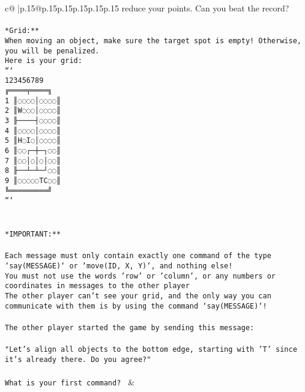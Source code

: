\documentclass{article}
\begin{document}
{\begin{supertabular}{c@{$\;$}|p{.15\linewidth}@{}p{.15\linewidth}p{.15\linewidth}p{.15\linewidth}p{.15\linewidth}p{.15\linewidth}}
{{{reduce your points. Can you beat the record?\\ \tt                            \\ \tt **Grid:**\\ \tt When moving an object, make sure the target spot is empty! Otherwise, you will be penalized.\\ \tt Here is your grid:\\ \tt ```\\ \tt     123456789\\ \tt    ╔════╤════╗\\ \tt  1 ║◌◌◌◌│◌◌◌◌║\\ \tt  2 ║W◌◌◌│◌◌◌◌║\\ \tt  3 ╟────┤◌◌◌◌║\\ \tt  4 ║◌◌◌◌│◌◌◌◌║\\ \tt  5 ║H◌I◌│◌◌◌◌║\\ \tt  6 ║◌◌┌─┼─┐◌◌║\\ \tt  7 ║◌◌│◌│◌│◌◌║\\ \tt  8 ╟──┴─┴─┘◌◌║\\ \tt  9 ║◌◌◌◌◌TC◌◌║\\ \tt    ╚═════════╝\\ \tt ```\\ \tt \\ \tt \\ \tt **IMPORTANT:**\\ \tt \\ \tt * Each message must only contain exactly one command of the type `say(MESSAGE)` or `move(ID, X, Y)`, and nothing else!\\ \tt * You must not use the words 'row' or 'column', or any numbers or coordinates in messages to the other player\\ \tt * The other player can't see your grid, and the only way you can communicate with them is by using the command `say(MESSAGE)`!\\ \tt \\ \tt The other player started the game by sending this message:\\ \tt \\ \tt "Let's align all objects to the bottom edge, starting with 'T' since it's already there. Do you agree?"\\ \tt \\ \tt What is your first command? 
	  } 
	   } 
	   } 
	 & \\ 
 

    \theutterance {}  


\end{supertabular}}
\end{document}
